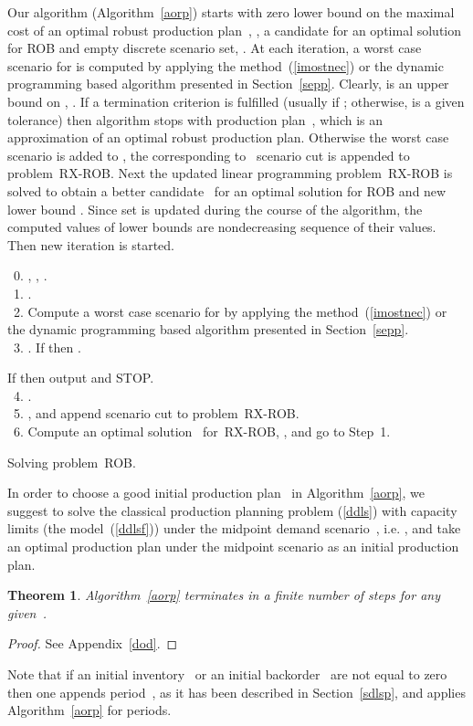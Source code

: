 \documentclass[11pt]{article}
\newtheorem{thm}{Theorem}
\begin{document}
Our algorithm (Algorithm~\ref{aorp}) starts with zero 
lower bound on the maximal cost of an optimal robust production plan~, ,
a candidate  for an optimal solution for \textsc{ROB} and
empty discrete scenario set, . 
At each iteration, a worst case scenario  
for  is computed by applying the method~(\ref{imostnec}) 
or the dynamic programming based algorithm presented in Section~\ref{sepp}.
Clearly,  is an upper bound on ,
. If a termination criterion is fulfilled (usually
 if ; 
otherwise,  is a given tolerance) then algorithm stops with 
production plan~, which is an approximation of 
an optimal robust production plan.
Otherwise
the worst case scenario  is added to ,
the corresponding to~ scenario cut  
is appended to
problem~\textsc{RX-ROB}. Next
the updated linear programming problem~\textsc{RX-ROB} 
 is solved to obtain a better 
candidate~ for an optimal solution for \textsc{ROB} and
new lower bound . Since set  is 
updated during the course of the algorithm,
the computed values of lower bounds are nondecreasing sequence of their values.
 Then new iteration is started. 
  \begin{algorithm}

\KwStep~0. , , .\\
\KwStep~1. .\\ 
\KwStep~2. Compute a worst case scenario  
                    for  by applying the method~(\ref{imostnec}) 
                    or the dynamic programming based algorithm presented in Section~\ref{sepp}.\\                   
\KwStep~3. . If  then . 

 If  then output  and STOP.\\	
\KwStep~4.  .\\		
\KwStep~5. ,  and
     append scenario   cut 
      to
     problem~\textsc{RX-ROB}.\\
\KwStep~6. Compute an optimal solution~ for~\textsc{RX-ROB},
                   , and go to Step~1.               
  \caption{Solving problem~\textsc{ROB}.}
  \label{aorp}
\end{algorithm}


In order to choose a good initial production plan~ in Algorithm~\ref{aorp},
we suggest to solve the classical production planning problem (\ref{ddls}) with capacity limits 
(the model~(\ref{ddlsf})) under the midpoint demand scenario~,
i.e. ,  and take an optimal production plan under the
midpoint scenario as an  initial production plan.
\begin{thm}
Algorithm~\ref{aorp} terminates in a finite number of steps for any given~.
\label{tconv}
\end{thm}
\begin{proof}
See Appendix~\ref{dod}.
\end{proof}
Note that 
if an initial inventory~ or an initial backorder~
are not equal to zero then one appends period~, as it has been described in Section~\ref{sdlsp},
and  applies Algorithm~\ref{aorp} for  periods.
\end{document}
